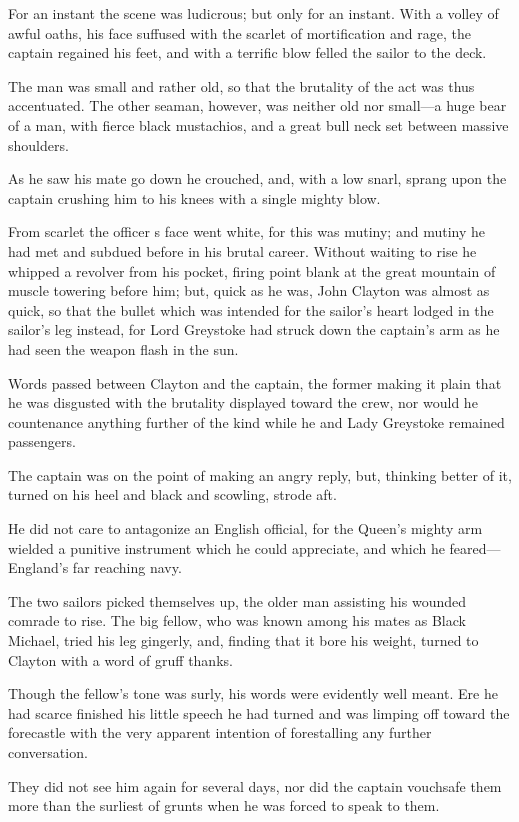 For an instant the scene was ludicrous; but only for an instant. With a volley of awful oaths, his face suffused with the scarlet of mortification and rage, the captain regained his feet, and with a terrific blow felled the sailor to the deck.

The man was small and rather old, so that the brutality of the act was thus accentuated. The other seaman, however, was neither old nor small—a huge bear of a man, with fierce black mustachios, and a great bull neck set between massive shoulders.

As he saw his mate go down he crouched, and, with a low snarl, sprang upon the captain crushing him to his knees with a single mighty blow.

From scarlet the officer s face went white, for this was mutiny; and mutiny he had met and subdued before in his brutal career. Without waiting to rise he whipped a revolver from his pocket, firing point blank at the great mountain of muscle towering before him; but, quick as he was, John Clayton was almost as quick, so that the bullet which was intended for the sailor’s heart lodged in the sailor’s leg instead, for Lord Greystoke had struck down the captain’s arm as he had seen the weapon flash in the sun.

Words passed between Clayton and the captain, the former making it plain that he was disgusted with the brutality displayed toward the crew, nor would he countenance anything further of the kind while he and Lady Greystoke remained passengers.

The captain was on the point of making an angry reply, but, thinking better of it, turned on his heel and black and scowling, strode aft.

He did not care to antagonize an English official, for the Queen’s mighty arm wielded a punitive instrument which he could appreciate, and which he feared—England’s far reaching navy.

The two sailors picked themselves up, the older man assisting his wounded comrade to rise. The big fellow, who was known among his mates as Black Michael, tried his leg gingerly, and, finding that it bore his weight, turned to Clayton with a word of gruff thanks.

Though the fellow’s tone was surly, his words were evidently well meant. Ere he had scarce finished his little speech he had turned and was limping off toward the forecastle with the very apparent intention of forestalling any further conversation.

They did not see him again for several days, nor did the captain vouchsafe them more than the surliest of grunts when he was forced to speak to them.

